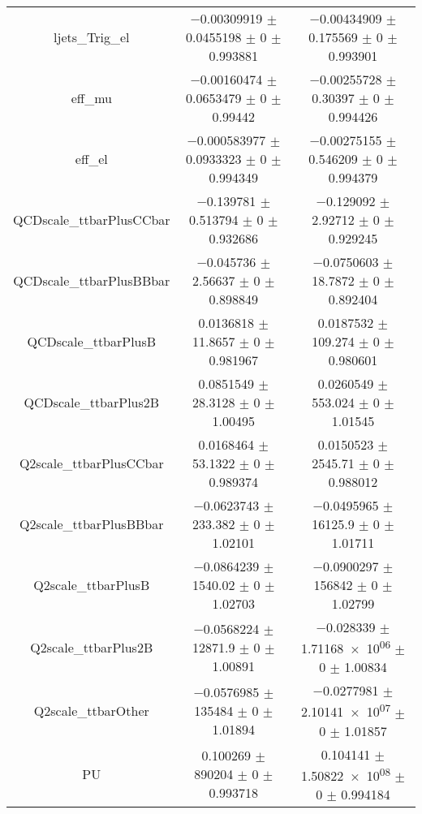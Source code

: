\begin{table}
\begin{tabular}{ccc}
ljets\_Trig\_el & \num{-0.00309919} $\pm$ \num{0.0455198} $\pm$ \num{0} $\pm$ \num{0.993881} & \num{-0.00434909} $\pm$ \num{0.175569} $\pm$ \num{0} $\pm$ \num{0.993901}\\
eff\_mu & \num{-0.00160474} $\pm$ \num{0.0653479} $\pm$ \num{0} $\pm$ \num{0.99442} & \num{-0.00255728} $\pm$ \num{0.30397} $\pm$ \num{0} $\pm$ \num{0.994426}\\
eff\_el & \num{-0.000583977} $\pm$ \num{0.0933323} $\pm$ \num{0} $\pm$ \num{0.994349} & \num{-0.00275155} $\pm$ \num{0.546209} $\pm$ \num{0} $\pm$ \num{0.994379}\\
QCDscale\_ttbarPlusCCbar & \num{-0.139781} $\pm$ \num{0.513794} $\pm$ \num{0} $\pm$ \num{0.932686} & \num{-0.129092} $\pm$ \num{2.92712} $\pm$ \num{0} $\pm$ \num{0.929245}\\
QCDscale\_ttbarPlusBBbar & \num{-0.045736} $\pm$ \num{2.56637} $\pm$ \num{0} $\pm$ \num{0.898849} & \num{-0.0750603} $\pm$ \num{18.7872} $\pm$ \num{0} $\pm$ \num{0.892404}\\
QCDscale\_ttbarPlusB & \num{0.0136818} $\pm$ \num{11.8657} $\pm$ \num{0} $\pm$ \num{0.981967} & \num{0.0187532} $\pm$ \num{109.274} $\pm$ \num{0} $\pm$ \num{0.980601}\\
QCDscale\_ttbarPlus2B & \num{0.0851549} $\pm$ \num{28.3128} $\pm$ \num{0} $\pm$ \num{1.00495} & \num{0.0260549} $\pm$ \num{553.024} $\pm$ \num{0} $\pm$ \num{1.01545}\\
Q2scale\_ttbarPlusCCbar & \num{0.0168464} $\pm$ \num{53.1322} $\pm$ \num{0} $\pm$ \num{0.989374} & \num{0.0150523} $\pm$ \num{2545.71} $\pm$ \num{0} $\pm$ \num{0.988012}\\
Q2scale\_ttbarPlusBBbar & \num{-0.0623743} $\pm$ \num{233.382} $\pm$ \num{0} $\pm$ \num{1.02101} & \num{-0.0495965} $\pm$ \num{16125.9} $\pm$ \num{0} $\pm$ \num{1.01711}\\
Q2scale\_ttbarPlusB & \num{-0.0864239} $\pm$ \num{1540.02} $\pm$ \num{0} $\pm$ \num{1.02703} & \num{-0.0900297} $\pm$ \num{156842} $\pm$ \num{0} $\pm$ \num{1.02799}\\
Q2scale\_ttbarPlus2B & \num{-0.0568224} $\pm$ \num{12871.9} $\pm$ \num{0} $\pm$ \num{1.00891} & \num{-0.028339} $\pm$ \num{1.71168e+06} $\pm$ \num{0} $\pm$ \num{1.00834}\\
Q2scale\_ttbarOther & \num{-0.0576985} $\pm$ \num{135484} $\pm$ \num{0} $\pm$ \num{1.01894} & \num{-0.0277981} $\pm$ \num{2.10141e+07} $\pm$ \num{0} $\pm$ \num{1.01857}\\
PU & \num{0.100269} $\pm$ \num{890204} $\pm$ \num{0} $\pm$ \num{0.993718} & \num{0.104141} $\pm$ \num{1.50822e+08} $\pm$ \num{0} $\pm$ \num{0.994184}\\

\end{tabular}
\end{table}
